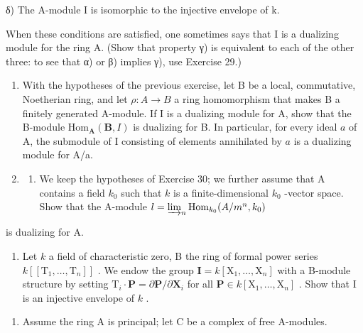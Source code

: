 δ) The A-module I is isomorphic to the injective envelope of k.

When these conditions are satisfied, one sometimes says that I is a dualizing module for the ring A. (Show that property γ) is equivalent to each of the other three: to see that α) or β) implies γ), use Exercise 29.)

\begin{enumerate}
\def\labelenumi{\arabic{enumi})}
\setcounter{enumi}{30}
\item
  With the hypotheses of the previous exercise, let B be a local, commutative, Noetherian ring, and let \(\rho: A \to B\) a ring homomorphism that makes B a finitely generated A-module. If I is a dualizing module for A, show that the B-module \(\mathrm{Hom}_{\mathbf{A}}(\mathbf{B}, I)\) is dualizing for B. In particular, for every ideal \(a\) of A, the submodule of I consisting of elements annihilated by \(a\) is a dualizing module for A/a.
\item
  \begin{enumerate}
  \def\labelenumii{\alph{enumii})}
  \tightlist
  \item
    We keep the hypotheses of Exercise 30; we further assume that A contains a field \(k_0\) such that \(k\) is a finite-dimensional \(k_0\) -vector space. Show that the A-module \(l = \varinjlim_{n} \operatorname{Hom}_{k_0}(A/m^n, k_0)\)
  \end{enumerate}
\end{enumerate}

is dualizing for A.

\begin{enumerate}
\def\labelenumi{\alph{enumi})}
\setcounter{enumi}{1}
\tightlist
\item
  Let \(k\) a field of characteristic zero, B the ring of formal power series \(k[[\mathrm{T}_{1}, \ldots, \mathrm{T}_{n}]]\) . We endow the group \(\mathbf{I} = k[\mathrm{X}_{1}, \ldots, \mathrm{X}_{n}]\) with a B-module structure by setting \(\mathrm{T}_{i} \cdot \mathbf{P} = \partial \mathbf{P} / \partial \mathbf{X}_{i}\) for all \(\mathbf{P} \in k[\mathrm{X}_{1}, \ldots, \mathrm{X}_{n}]\) . Show that I is an injective envelope of \(k\) .
\end{enumerate}


\begin{enumerate}
\def\labelenumi{\arabic{enumi})}
\tightlist
\item
  Assume the ring A is principal; let C be a complex of free A-modules.
\end{enumerate}

